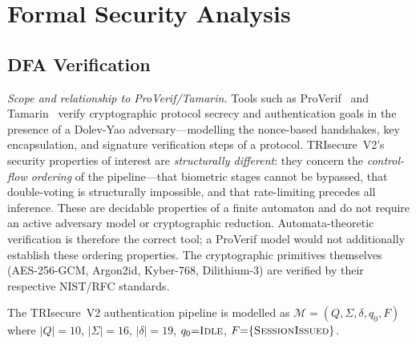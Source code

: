 \documentclass[conference]{IEEEtran}
\begin{document}
\section{Formal Security Analysis}
\label{sec:security}

\subsection{DFA Verification}
\label{sec:dfa}

\textit{Scope and relationship to ProVerif/Tamarin.}
Tools such as ProVerif~\cite{blanchet2016proverif} and
Tamarin~\cite{meier2013tamarin} verify cryptographic protocol secrecy and
authentication goals in the presence of a Dolev-Yao adversary—modelling the
nonce-based handshakes, key encapsulation, and signature verification steps
of a protocol. TRIsecure~V2's security properties of interest are
\emph{structurally different}: they concern the \emph{control-flow ordering}
of the pipeline—that biometric stages cannot be bypassed, that double-voting
is structurally impossible, and that rate-limiting precedes all inference.
These are decidable properties of a finite automaton and do not require an
active adversary model or cryptographic reduction. Automata-theoretic
verification is therefore the correct tool; a ProVerif model would not
additionally establish these ordering properties. The cryptographic
primitives themselves (AES-256-GCM, Argon2id, Kyber-768, Dilithium-3) are
verified by their respective NIST/RFC standards.

The TRIsecure~V2 authentication pipeline is modelled as
\(\mathcal{M} = (Q, \Sigma, \delta, q_0, F)\) where
\(|Q|{=}10\), \(|\Sigma|{=}16\), \(|\delta|{=}19\),
\(q_0{=}\textsc{Idle}\), \(F{=}\{\textsc{SessionIssued}\}\).
\end{document}
